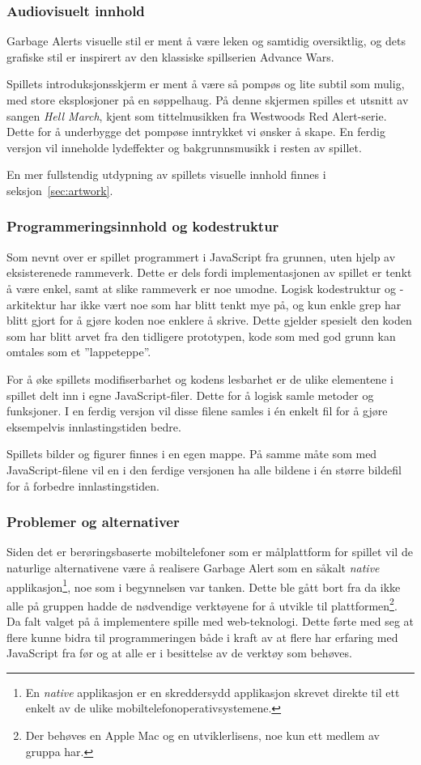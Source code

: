 \subsubsection{Audiovisuelt innhold}
Garbage Alerts visuelle stil er ment å være leken og samtidig
oversiktlig, og dets grafiske stil er inspirert av den klassiske
spillserien Advance Wars.

Spillets introduksjonsskjerm er ment å være så pompøs og lite subtil som
mulig, med store eksplosjoner på en søppelhaug. På denne skjermen
spilles et utsnitt av sangen \emph{Hell March}, kjent som tittelmusikken
fra Westwoods Red Alert-serie. Dette for å underbygge det pompøse
inntrykket vi ønsker å skape. En ferdig versjon vil inneholde
lydeffekter og bakgrunnsmusikk i resten av spillet.

En mer fullstendig utdypning av spillets visuelle innhold finnes i
seksjon~\ref{sec:artwork}.


\subsubsection{Programmeringsinnhold og kodestruktur}
Som nevnt over er spillet programmert i JavaScript fra grunnen, uten
hjelp av eksisterenede rammeverk. Dette er dels fordi
implementasjonen av spillet er tenkt å være enkel, samt at slike
rammeverk er noe umodne.  Logisk kodestruktur og -arkitektur har ikke
vært noe som har blitt tenkt mye på, og kun enkle grep har blitt gjort
for å gjøre koden noe enklere å skrive. Dette gjelder spesielt den koden
som har blitt arvet fra den tidligere prototypen, kode som med god grunn
kan omtales som et ''lappeteppe''.

For å øke spillets modifiserbarhet og kodens lesbarhet er de ulike
elementene i spillet delt inn i egne JavaScript-filer. Dette for å
logisk samle metoder og funksjoner. I en ferdig versjon vil disse filene
samles i én enkelt fil for å gjøre eksempelvis innlastingstiden bedre.

Spillets bilder og figurer finnes i en egen mappe. På samme måte som med
JavaScript-filene vil en i den ferdige versjonen ha alle bildene i én
større bildefil for å forbedre innlastingstiden.


\subsubsection{Problemer og alternativer}
Siden det er berøringsbaserte mobiltelefoner som er målplattform for
spillet vil de naturlige alternativene være å realisere Garbage Alert
som en såkalt \emph{native} applikasjon\footnote{En \emph{native}
applikasjon er en skreddersydd applikasjon skrevet direkte til ett
enkelt av de ulike mobiltelefonoperativsystemene.}, noe som i
begynnelsen var tanken. Dette ble gått bort fra da ikke alle på gruppen
hadde de nødvendige verktøyene for å utvikle til
plattformen\footnote{Der behøves en Apple Mac og en utviklerlisens, noe
kun ett medlem av gruppa har.}. Da falt valget på å implementere
spille med web-teknologi. Dette førte med seg at flere kunne bidra til
programmeringen både i kraft av at flere har erfaring med JavaScript
fra før og at alle er i besittelse av de verktøy som behøves.

